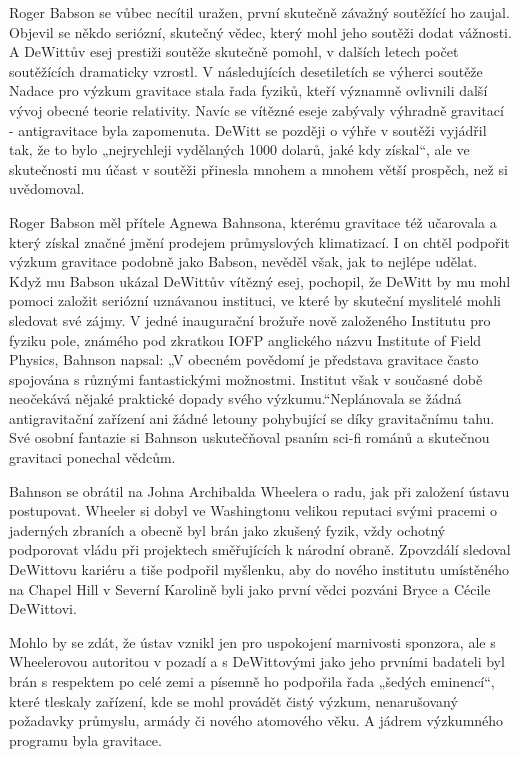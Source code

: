   Roger Babson se vůbec necítil uražen, první skutečně závažný soutěžící ho zaujal. Objevil se někdo
  seriózní, skutečný vědec, který mohl jeho soutěži dodat vážnosti. A DeWittův esej prestiži soutěže
  skutečně pomohl, v dalších letech počet soutěžících dramaticky vzrostl. V následujících
  desetiletích se výherci soutěže Nadace pro výzkum gravitace stala řada fyziků, kteří významně
  ovlivnili další vývoj obecné teorie relativity. Navíc se vítězné eseje zabývaly výhradně gravitací
  - antigravitace byla zapomenuta. DeWitt se později o výhře v soutěži vyjádřil tak, že to bylo
  „nejrychleji vydělaných 1000 dolarů, jaké kdy získal“, ale ve skutečnosti mu účast v soutěži
  přinesla mnohem a mnohem větší prospěch, než si uvědomoval. 

  Roger Babson měl přítele Agnewa Bahnsona, kterému gravitace též učarovala a který získal značné
  jmění prodejem průmyslových klimatizací. I on chtěl podpořit výzkum gravitace podobně jako Babson,
  nevěděl však, jak to nejlépe udělat. Když mu Babson ukázal DeWittův vítězný esej, pochopil, že
  DeWitt by mu mohl pomoci založit seriózní uznávanou instituci, ve které by skuteční myslitelé
  mohli sledovat své zájmy. V jedné inaugurační brožuře nově založeného Institutu pro fyziku pole,
  známého pod zkratkou IOFP anglického názvu Institute of Field Physics, Bahnson napsal: „V obecném
  povědomí je představa gravitace často spojována s různými fantastickými možnostmi. Institut však v
  současné době neočekává nějaké praktické dopady svého výzkumu.“Neplánovala se žádná antigravitační
  zařízení ani žádné letouny pohybující se díky gravitačnímu tahu. Své osobní fantazie si Bahnson
  uskutečňoval psaním sci-fi románů a skutečnou gravitaci ponechal vědcům. 

  Bahnson se obrátil na Johna Archibalda Wheelera o radu, jak při založení ústavu postupovat.
  Wheeler si dobyl ve Washingtonu velikou reputaci svými pracemi o jaderných zbraních a obecně byl
  brán jako zkušený fyzik, vždy ochotný podporovat vládu při projektech směřujících k národní
  obraně. Zpovzdálí sledoval DeWittovu kariéru a tiše podpořil myšlenku, aby do nového institutu
  umístěného na Chapel Hill v Severní Karolině byli jako první vědci pozváni Bryce a Cécile
  DeWittovi. 

  Mohlo by se zdát, že ústav vznikl jen pro uspokojení marnivosti sponzora, ale s Wheelerovou
  autoritou v pozadí a s DeWittovými jako jeho prvními badateli byl brán s respektem po celé zemi a
  písemně ho podpořila řada „šedých eminencí“, které tleskaly zařízení, kde se mohl provádět čistý
  výzkum, nenarušovaný požadavky průmyslu, armády či nového atomového věku. A jádrem výzkumného
  programu byla gravitace. 


